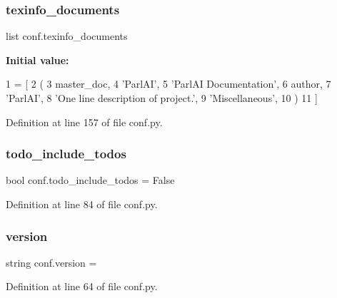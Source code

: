 \mbox{\label{namespaceconf_a54b0faed214ac92017d5689efbb10672}} 
\subsubsection{\texorpdfstring{texinfo\+\_\+documents}{texinfo\_documents}}
{\footnotesize\ttfamily list conf.\+texinfo\+\_\+documents}

{\bfseries Initial value\+:}
\begin{DoxyCode}
1 =  [
2     (
3         master\_doc,
4         \textcolor{stringliteral}{'ParlAI'},
5         \textcolor{stringliteral}{'ParlAI Documentation'},
6         author,
7         \textcolor{stringliteral}{'ParlAI'},
8         \textcolor{stringliteral}{'One line description of project.'},
9         \textcolor{stringliteral}{'Miscellaneous'},
10     )
11 ]
\end{DoxyCode}


Definition at line 157 of file conf.\+py.

\mbox{\label{namespaceconf_a8fe7f0d85f975f4ecba5cb6066959a09}} 
\subsubsection{\texorpdfstring{todo\+\_\+include\+\_\+todos}{todo\_include\_todos}}
{\footnotesize\ttfamily bool conf.\+todo\+\_\+include\+\_\+todos = False}



Definition at line 84 of file conf.\+py.

\mbox{\label{namespaceconf_ade15c5b54093b64d7c428ec19ca5b1cb}} 
\subsubsection{\texorpdfstring{version}{version}}
{\footnotesize\ttfamily string conf.\+version = \textquotesingle{}\textquotesingle{}}



Definition at line 64 of file conf.\+py.

